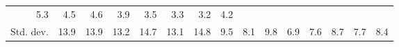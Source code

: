 \begin{tabular}{lllllllllllllll}
  \multicolumn{1}{r}{5.3} &
  \multicolumn{1}{r}{4.5} &
  \multicolumn{1}{r}{4.6} &
  \multicolumn{1}{r}{3.9} &
  \multicolumn{1}{r}{3.5} &
  \multicolumn{1}{r}{3.3} &
  \multicolumn{1}{r}{3.2} &
  \multicolumn{1}{r}{4.2} \\
\multicolumn{1}{l}{\hspace{2em}Std. dev.} &
  \multicolumn{1}{|r}{13.9} &
  \multicolumn{1}{r}{13.9} &
  \multicolumn{1}{r}{13.2} &
  \multicolumn{1}{r}{14.7} &
  \multicolumn{1}{r}{13.1} &
  \multicolumn{1}{r}{14.8} &
  \multicolumn{1}{r}{9.5} &
  \multicolumn{1}{r}{8.1} &
  \multicolumn{1}{r}{9.8} &
  \multicolumn{1}{r}{6.9} &
  \multicolumn{1}{r}{7.6} &
  \multicolumn{1}{r}{8.7} &
  \multicolumn{1}{r}{7.7} &
  \multicolumn{1}{r}{8.4} \\
\cline{1-15}
\end{tabular}
